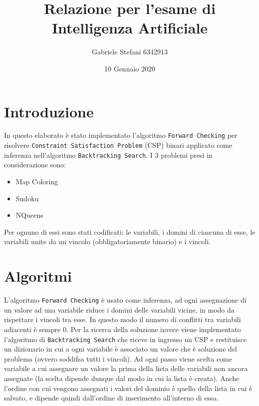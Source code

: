 \documentclass[11pt]{article}
\begin{document}
\title{Relazione per l’esame di\\Intelligenza Artificiale}
\author{Gabriele Stefani 6342913}
\date{10 Gennaio 2020}
\maketitle

\section{Introduzione}
In questo elaborato è stato implementato l’algoritmo \texttt{Forward Checking} per risolvere \texttt{Constraint Satisfaction Problem} (CSP) binari applicato come inferenza nell’algoritmo \texttt{Backtracking Search}. 
I 3 problemi presi in considerazione sono: 
\begin{itemize}
  \item Map Coloring
  \item Sudoku
  \item NQueens
\end{itemize}
Per ognuno di essi sono stati codificati: le variabili, i domini di ciascuna di esse, le variabili unite da un vincolo (obbligatoriamente binario) e i vincoli.

\section{Algoritmi}
L’algoritmo \texttt{Forward Checking} è usato come inferenza, ad ogni assegnazione di un valore ad una variabile riduce i domini delle variabili vicine, in modo da rispettare i vincoli tra esse. In questo modo il numero di conflitti tra variabili adiacenti è sempre 0.
Per la ricerca della soluzione invece viene implementato l'algoritmo di \texttt{Backtracking Search} che riceve in ingresso un CSP e restituisce un dizionario in cui a ogni variabile è associato un valore che è soluzione del problema (ovvero soddifsa tutti i vincoli). 
Ad ogni passo viene scelta come variabile a cui assegnare un valore la prima della lista delle variabili non ancora assegnate (la scelta dipende dunque dal modo in cui la lista è creata). Anche l’ordine con cui vengono assegnati i valori del dominio è quello della lista in cui è salvato, e dipende quindi dall'ordine di inserimento all'interno di essa.
\end{document}
